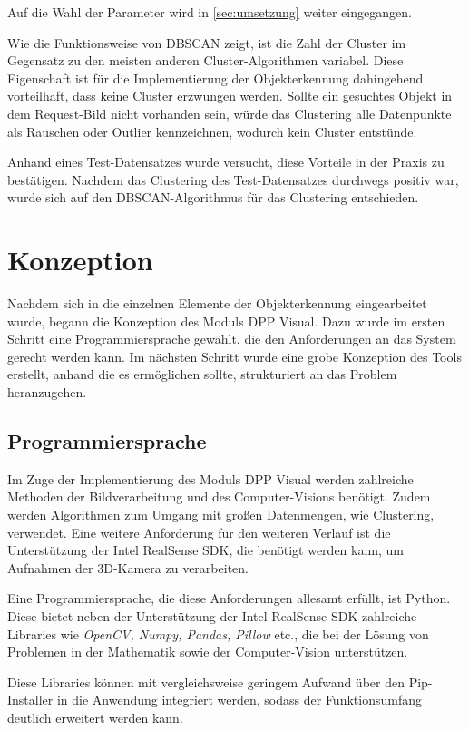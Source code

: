 \documentclass[
    type=Prakikumsbericht,
    status=draft, %
    language=german, %
    bibengine=bibtex,
]{unibwm-inf-thesis}
\begin{document}
    Auf die Wahl der Parameter wird in \autoref{sec:umsetzung} weiter eingegangen.

    Wie die Funktionsweise von \ac{DBSCAN} zeigt, ist die Zahl der Cluster im Gegensatz zu den meisten anderen Cluster-Algorithmen variabel.
    Diese Eigenschaft ist für die Implementierung der Objekterkennung dahingehend vorteilhaft, dass keine Cluster \glqq erzwungen\grqq{} werden.
    Sollte ein gesuchtes Objekt in dem Request-Bild nicht vorhanden sein, würde das Clustering alle Datenpunkte als Rauschen oder Outlier kennzeichnen, wodurch kein Cluster entstünde.

    Anhand eines Test-Datensatzes wurde versucht, diese Vorteile in der Praxis zu bestätigen.
    Nachdem das Clustering des Test-Datensatzes durchwegs positiv war, wurde sich auf den \ac{DBSCAN}-Algorithmus für das Clustering entschieden.

    
    \section{Konzeption}
    Nachdem sich in die einzelnen Elemente der Objekterkennung eingearbeitet wurde, begann die Konzeption des Moduls \ac{DPP} Visual.
    Dazu wurde im ersten Schritt eine Programmiersprache gewählt, die den Anforderungen an das System gerecht werden kann.
    Im nächsten Schritt wurde eine grobe Konzeption des Tools erstellt, anhand die es ermöglichen sollte, strukturiert an das Problem heranzugehen.

    \subsection{Programmiersprache}
    Im Zuge der Implementierung des Moduls DPP Visual werden zahlreiche Methoden der Bildverarbeitung und des
    Computer-Visions benötigt.
    Zudem werden Algorithmen zum Umgang mit großen Datenmengen, wie Clustering, verwendet.
    Eine weitere Anforderung für den weiteren Verlauf ist die Unterstützung der Intel RealSense SDK, die benötigt werden kann,
    um Aufnahmen der 3D-Kamera zu verarbeiten.

    Eine Programmiersprache, die diese Anforderungen allesamt erfüllt, ist Python.
    Diese bietet neben der Unterstützung der Intel RealSense SDK zahlreiche Libraries wie \textit{OpenCV, Numpy, Pandas, Pillow} etc., die bei der Lösung von Problemen in der Mathematik sowie der Computer-Vision unterstützen.

    Diese Libraries können mit vergleichsweise geringem Aufwand über den Pip-Installer in die Anwendung integriert
    werden, sodass der Funktionsumfang deutlich erweitert werden kann.
\end{document}

